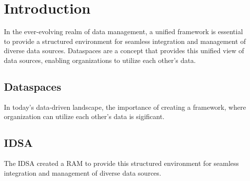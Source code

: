 
\chapter{Introduction}

In the ever-evolving realm of data management, a unified framework is essential to provide a structured environment for seamless integration and management of diverse data sources. Dataspaces are a concept that provides this unified view of data sources, enabling organizations to utilize each other's data.

\section{Dataspaces}

In today's data-driven landscape, the importance of creating a framework, where organization can utilize each other's data is sigificant. 

\section{IDSA}

The \ac{IDSA} created a \ac{RAM}\cite{ids-ram} to provide this structured environment for seamless integration and management of diverse data sources.
